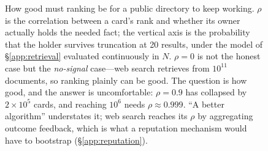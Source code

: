 \begin{figure}[t]
\caption{How good must ranking be for a public directory to keep working. $\rho$ is the
correlation between a card's rank and whether its owner actually holds the needed fact; the
vertical axis is the probability that the holder survives truncation at 20 results, under
the model of \S\ref{app:retrieval} evaluated continuously in $N$. $\rho=0$ is not the
honest case but the \emph{no-signal} case---web search retrieves from $10^{11}$ documents,
so ranking plainly can be good. The question is how good, and the answer is uncomfortable:
$\rho = 0.9$ has collapsed by $2\times10^5$ cards, and reaching $10^6$ needs
$\rho \approx 0.999$. ``A better algorithm'' understates it; web search reaches its $\rho$
by aggregating outcome feedback, which is what a reputation mechanism would have to
bootstrap (\S\ref{app:reputation}).}
\label{fig:rho}
\end{figure}
